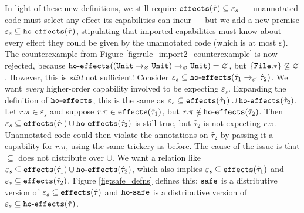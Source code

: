 In light of these new definitions, we still require
$\mathtt{effects}(\hat \tau) \subseteq \varepsilon_s$ --- unannotated code must
select any effect its capabilities can incur --- but we add a new
premise $\varepsilon_s \subseteq \mathtt{ho \hbox{-} effects}(\hat \tau)$, stipulating that
imported capabilities must know about every effect they could be given
by the unannotated code (which is at most $\varepsilon$). The
counterexample from Figure \ref{fig:rule_import2_counterexample} is
now rejected, because
$\mathtt{ho \hbox{-} effects}((\mathtt{Unit} \rightarrow_{\varnothing} \mathtt{Unit})
  \rightarrow_{\varnothing} \mathtt{Unit}) = \varnothing$, but
$\{ \mathtt{File.*} \} \not\subseteq \varnothing$.  However, this is
\textit{still} not sufficient! Consider
$\varepsilon_s \subseteq \mathtt{ho \hbox{-} effects}( \hat \tau_1 \rightarrow_{\varepsilon'}
  \hat \tau_2 )$. We want \textit{every} higher-order capability
involved to be expecting $\varepsilon_s$. Expanding the definition of
$\mathtt{ho \hbox{-} effects}$, this is the same as
$\varepsilon_s \subseteq \mathtt{effects}(\hat \tau_1) \cup \mathtt{ho \hbox{-} effects}(\hat
  \tau_2)$. Let $r.\pi \in \varepsilon_s$ and suppose
$r.\pi \in \mathtt{effects}(\hat \tau_1)$, but $r.\pi \notin \mathtt{ho \hbox{-} effects}(\hat
  \tau_2)$. Then
$\varepsilon_s \subseteq \mathtt{effects}(\hat \tau_1) \cup \mathtt{ho \hbox{-} effects}(\hat \tau_2)$ is
still true, but $\hat \tau_2$ is not expecting $r.\pi$. Unannotated
code could then violate the annotations on $\hat \tau_2$ by passing it
a capability for $r.\pi$, using the same trickery as before. The cause
of the issue is that $\subseteq$ does not distribute over $\cup$. We
want a relation like
$\varepsilon_s \subseteq \mathtt{effects}(\hat \tau_1) \cup \mathtt{ho \hbox{-} effects}(\hat \tau_2)$,
which also implies $\varepsilon_s \subseteq \mathtt{effects}(\hat \tau_1)$ and
$\varepsilon_s \subseteq \mathtt{effects}(\hat \tau_2)$. Figure
\ref{fig:safe_defns} defines this: $\mathtt{safe}$ is a distributive
version of $\varepsilon_s \subseteq \mathtt{effects}(\hat \tau)$ and
$\mathtt{ho \hbox{-} safe}$ is a distributive version of
$\varepsilon_s \subseteq \mathtt{ho \hbox{-} effects}(\hat \tau)$.

